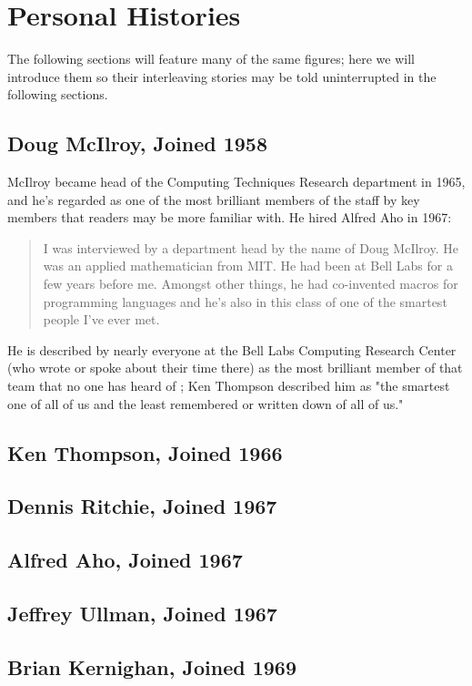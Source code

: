 
\section{Personal Histories}

The following sections will feature many of the same figures;
here we will introduce them so their interleaving stories may be told
uninterrupted in the following sections.

\subsection{Doug McIlroy, Joined 1958}

McIlroy became head of the Computing Techniques Research department in 1965, and he's regarded
as one of the most brilliant members of the staff by key members that readers may be more familiar with.
He hired Alfred Aho in 1967\cite{aho_oral_history_2022}:

\begin{quotation}
I was interviewed by a department head by the name of Doug McIlroy. He was an applied
mathematician from MIT. He had been at Bell Labs for a few years before me. Amongst other things, he
had co-invented macros for programming languages and he's also in this class of one of the smartest
people I've ever met.
\end{quotation}

He is described by nearly everyone at the Bell Labs Computing Research Center
(who wrote or spoke about their time there)
as the most brilliant member of that team that no one has heard of
\cite{kernighan_interviews_thompson_2019}; Ken Thompson described him as
"the smartest one of all of us and the least remembered or written down of all of us."

\subsection{Ken Thompson, Joined 1966}
\subsection{Dennis Ritchie, Joined 1967}
\subsection{Alfred Aho, Joined 1967}
\subsection{Jeffrey Ullman, Joined 1967}
\subsection{Brian Kernighan, Joined 1969}
